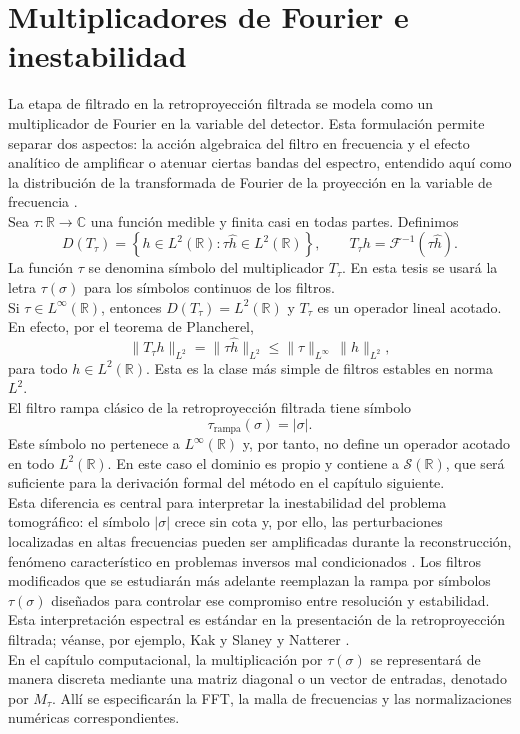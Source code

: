 \section{Multiplicadores de Fourier e inestabilidad}
\label{FourierMultipliersInstability}

La etapa de filtrado en la retroproyección filtrada se modela como un multiplicador de Fourier en la variable del detector. Esta formulación permite separar dos aspectos: la acción algebraica del filtro en frecuencia y el efecto analítico de amplificar o atenuar ciertas bandas del espectro, entendido aquí como la distribución de la transformada de Fourier de la proyección en la variable de frecuencia \cite[Ap.~B.8]{kuchment2014}.\\

Sea $\tau:\mathbb{R}\to\mathbb{C}$ una función medible y finita casi en todas partes. Definimos
\[
D(T_{\tau})
=
\left\{
h\in L^{2}(\mathbb{R}):
\tau\widehat h\in L^{2}(\mathbb{R})
\right\},
\qquad
T_{\tau}h
=
\mathcal{F}^{-1}\left(\tau\widehat h\right).
\]
La función $\tau$ se denomina símbolo del multiplicador $T_\tau$. En esta tesis se usará la letra $\tau(\sigma)$ para los símbolos continuos de los filtros.\\

Si $\tau\in L^{\infty}(\mathbb{R})$, entonces $D(T_{\tau})=L^{2}(\mathbb{R})$ y $T_{\tau}$ es un operador lineal acotado. En efecto, por el teorema de Plancherel,
\[
\|T_{\tau}h\|_{L^{2}}
=
\|\tau\widehat h\|_{L^{2}}
\leq
\|\tau\|_{L^{\infty}}\,\|h\|_{L^{2}},
\]
para todo $h\in L^{2}(\mathbb{R})$. Esta es la clase más simple de filtros estables en norma $L^{2}$.\\

El filtro rampa clásico de la retroproyección filtrada tiene símbolo
\[
\tau_{\mathrm{rampa}}(\sigma)=|\sigma|.
\]
Este símbolo no pertenece a $L^{\infty}(\mathbb{R})$ y, por tanto, no define un operador acotado en todo $L^{2}(\mathbb{R})$. En este caso el dominio es propio y contiene a $\mathcal{S}(\mathbb{R})$, que será suficiente para la derivación formal del método en el capítulo siguiente.\\

Esta diferencia es central para interpretar la inestabilidad del problema tomográfico: el símbolo $|\sigma|$ crece sin cota y, por ello, las perturbaciones localizadas en altas frecuencias pueden ser amplificadas durante la reconstrucción, fenómeno característico en problemas inversos mal condicionados \cite{kirsch2011}. Los filtros modificados que se estudiarán más adelante reemplazan la rampa por símbolos $\tau(\sigma)$ diseñados para controlar ese compromiso entre resolución y estabilidad. Esta interpretación espectral es estándar en la presentación de la retroproyección filtrada; véanse, por ejemplo, Kak y Slaney \cite[Cap.~3]{kak_slaney1988} y Natterer \cite[Sec.~V.1]{natterer2001}.\\

En el capítulo computacional, la multiplicación por $\tau(\sigma)$ se representará de manera discreta mediante una matriz diagonal o un vector de entradas, denotado por $M_{\tau}$. Allí se especificarán la FFT, la malla de frecuencias y las normalizaciones numéricas correspondientes.
